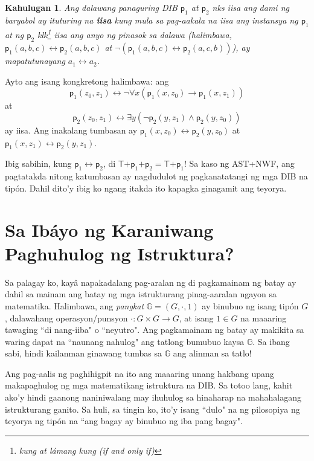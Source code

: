 \documentclass{article}
\newtheorem{definition}{Kahulugan}[section]
\begin{document}
\begin{definition}
\label{tumbasan}
Ang dalawang panaguring DIB $\textsf{p}_1$ at $\textsf{p}_2$ nks iisa ang dami ng baryabol ay ituturing na \textbf{iisa} kung mula sa pag-aakala na iisa ang instansya ng $\textsf{p}_1$ at ng $\textsf{p}_2$ klk\footnote{kung at lámang kung (if and only if)} iisa ang anyo ng pinasok sa dalawa (halimbawa, $\textsf{p}_1(a, b, c) \leftrightarrow \textsf{p}_2(a, b, c)$ at $\neg(\textsf{p}_1(a, b, c) \leftrightarrow \textsf{p}_2(a, c, b))$), ay mapatutunayang $a_1 \leftrightarrow a_2$.
\end{definition}

Ayto ang isang kongkretong halimbawa: ang $$\textsf{p}_1(z_0, z_1) \leftrightarrow \neg\forall x(\textsf{p}_1(x, z_0) \rightarrow \textsf{p}_1(x, z_1))$$ at $$\textsf{p}_2(z_0, z_1) \leftrightarrow \exists y(\neg \textsf{p}_2(y, z_1) \wedge \textsf{p}_2(y, z_0))$$ ay iisa. Ang inakalang tumbasan ay $\textsf{p}_1(x, z_0) \leftrightarrow \textsf{p}_2(y, z_0)$ at $\textsf{p}_1(x, z_1) \leftrightarrow \textsf{p}_2(y, z_1)$.

Ibig sabihin, kung $\textsf{p}_1 \leftrightarrow \textsf{p}_2$, di $\textsf{T+}\textsf{p}_1\textsf{+p}_2 = \textsf{T+}\textsf{p}_1$! Sa kaso ng \textsf{AST+NWF}, ang pagtatakda nitong katumbasan ay nagdudulot ng pagkanatatangi ng mga DIB na tipón. Dahil dito'y ibig ko ngang itakda ito kapagka ginagamit ang teyorya.  

\section{Sa Ibáyo ng Karaniwang Paghuhulog ng Istruktura?}

Sa palagay ko, kayâ napakadalang pag-aralan ng di pagkamainam ng batay ay dahil sa mainam ang batay ng mga istrukturang pinag-aaralan ngayon sa matematika. Halimbawa, ang \textit{pangkat} $\mathbb{G} = (G, \cdot, 1)$ ay binubuo ng isang tipón $G$, dalawahang operasyon/punsyon $\cdot:G \times G \rightarrow G$, at isang $1 \in G$ na maaaring tawaging ``di nang-iiba" o ``neyutro". Ang pagkamainam ng batay ay makikita sa waring dapat na ``naunang nahulog" ang tatlong bumubuo kaysa $\mathbb{G}$. Sa ibang sabi, hindi kailanman ginawang tumbas sa $\mathbb{G}$ ang alinman sa tatlo!

Ang pag-aalis ng paghihigpit na ito ang maaaring unang hakbang upang makapaghulog ng mga matematikang istruktura na DIB. Sa totoo lang, kahit ako'y hindi gaanong naniniwalang may ihuhulog sa hinaharap na mahahalagang istrukturang ganito. Sa huli, sa tingin ko, ito'y isang ``dulo" na ng pilosopiya ng teyorya ng tipón na ``ang bagay ay binubuo ng iba pang bagay". 



\end{document}
